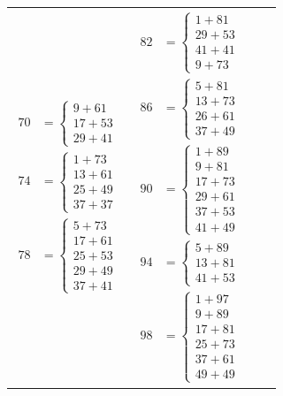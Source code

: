 \documentclass[12pt]{article}
\begin{document}
\begin{tabular}{l|l|l|l}
{\begin{align*}
      70 &= \begin{cases}
        9 + 61 \\ 17 + 53 \\ 29 + 41
      \end{cases} \\
      74 &= \begin{cases}
        1 + 73 \\ 13 + 61 \\ 25 + 49 \\ 37 + 37
      \end{cases} \\
      78 &= \begin{cases}
        5 + 73 \\ 17 + 61 \\ 25 + 53 \\ 29 + 49 \\ 37 + 41
      \end{cases}
    \end{align*}} &  
\parbox[t]{0.2\linewidth}{%
    \vspace*{-\baselineskip}
    \begin{align*} 
      82 &= \begin{cases}
        1 + 81 \\ 29 + 53 \\ 41 + 41 \\ 9 + 73
      \end{cases} \\
      86 &= \begin{cases}
        5 + 81 \\ 13 + 73 \\ 26 + 61 \\ 37 + 49
      \end{cases} \\
      90 &= \begin{cases}
        1 + 89 \\ 9 + 81 \\ 17 + 73 \\ 29 + 61 \\ 37 + 53 \\ 41 + 49
      \end{cases} \\ 
      94 &= \begin{cases}
        5 + 89 \\ 13 + 81 \\ 41 + 53
      \end{cases} \\
      98 &= \begin{cases}
        1 + 97 \\ 9 + 89 \\ 17 + 81 \\ 25 + 73 \\ 37 + 61 \\ 49 + 49
      \end{cases}
    \end{align*}}
\end{tabular}
\end{document}
